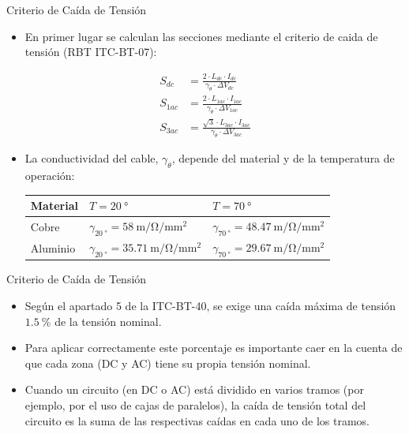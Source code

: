 \documentclass[aspectratio=169, usenames,svgnames,dvipsnames]{beamer}
\begin{document}
\begin{frame}[label={sec:orgc0f8e5b}]{Criterio de Caída de Tensión}
\begin{itemize}
\item En primer lugar se calculan las secciones mediante el criterio de caida de tensión (RBT ITC-BT-07):
\end{itemize}
\begin{align*}
    S_{dc} &=  \frac{2 \cdot L_{dc}\cdot I_{dc}}{\gamma_\theta \cdot \Delta V_{dc}}\\
    S_{1ac} &=  \frac{2\cdot L_{1ac}\cdot I_{1ac}}{\gamma_\theta \cdot \Delta V_{1ac}}\\
    S_{3ac} &= \frac{\sqrt{3} \cdot L_{3ac}\cdot I_{3ac}}{\gamma_\theta \cdot \Delta V_{3ac}}
  \end{align*}

\begin{itemize}
\item La conductividad del cable, \(\gamma_\theta\), depende del material y de la
temperatura de operación:

\begin{center}
\begin{tabular}{lll}
Material & \(T = \qty{20}{\degree}\) & \(T = \qty{70}{\degree}\)\\[0pt]
\hline
Cobre & \(\gamma_{\qty{20}{\degree}} = \qty{58}{\meter\per\ohm\per\milli\meter\squared}\) & \(\gamma_{\qty{70}{\degree}} = \qty{48,47}{\meter\per\ohm\per\milli\meter\squared}\)\\[0pt]
Aluminio & \(\gamma_{\qty{20}{\degree}} = \qty{35,71}{\meter\per\ohm\per\milli\meter\squared}\) & \(\gamma_{\qty{70}{\degree}} = \qty{29,67}{\meter\per\ohm\per\milli\meter\squared}\)\\[0pt]
\end{tabular}
\end{center}
\end{itemize}
\end{frame}

\begin{frame}[label={sec:org3a70dbd}]{Criterio de Caída de Tensión}
\begin{itemize}
\item Según el apartado 5 de la ITC-BT-40, se exige una caída máxima de
tensión \(\qty{1.5}{\percent}\) de la tensión nominal.

\item Para aplicar correctamente este porcentaje es importante caer en la
cuenta de que \alert{cada zona (DC y AC) tiene su propia tensión nominal}.

\item Cuando un circuito (en DC o AC) está dividido en varios tramos (por
ejemplo, por el uso de cajas de paralelos), la caída de tensión
total del circuito es la suma de las respectivas caídas en cada uno
de los tramos.
\end{itemize}
\end{frame}
\end{document}
